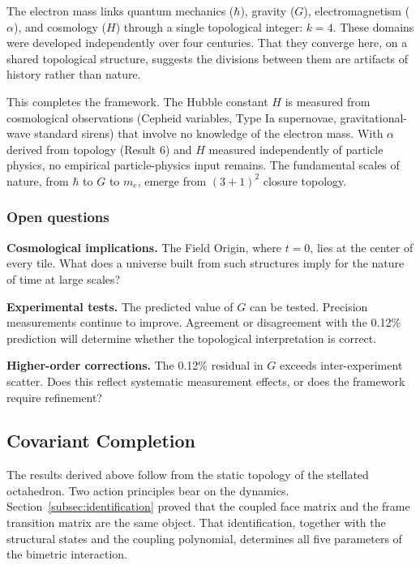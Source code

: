 \documentclass[aps,prd,preprint,superscriptaddress,showpacs,preprintnumbers,amsmath,amssymb,nofootinbib]{revtex4-2}
\begin{document}
The electron mass links quantum mechanics ($\hbar$), gravity ($G$), electromagnetism ($\alpha$), and cosmology ($H$) through a single topological integer: $k = 4$. These domains were developed independently over four centuries. That they converge here, on a shared topological structure, suggests the divisions between them are artifacts of history rather than nature.

This completes the framework. The Hubble constant $H$ is measured from cosmological observations (Cepheid variables, Type Ia supernovae, gravitational-wave standard sirens) that involve no knowledge of the electron mass. With $\alpha$ derived from topology (Result 6) and $H$ measured independently of particle physics, no empirical particle-physics input remains. The fundamental scales of nature, from $\hbar$ to $G$ to $m_e$, emerge from $(3+1)^2$ closure topology.

\subsubsection*{Open questions}

\textbf{Cosmological implications.} The Field Origin, where $t = 0$, lies at the center of every tile. What does a universe built from such structures imply for the nature of time at large scales?

\textbf{Experimental tests.} The predicted value of $G$ can be tested. Precision measurements continue to improve. Agreement or disagreement with the 0.12\% prediction will determine whether the topological interpretation is correct.

\textbf{Higher-order corrections.} The 0.12\% residual in $G$ exceeds inter-experiment scatter. Does this reflect systematic measurement effects, or does the framework require refinement?

\subsection{Covariant Completion}
\label{subsec:covariant-completion}

The results derived above follow from the static topology of the stellated octahedron. Two action principles bear on the dynamics. Section~\ref{subsec:identification} proved that the coupled face matrix and the frame transition matrix are the same object. That identification, together with the structural states and the coupling polynomial, determines all five parameters of the bimetric interaction.
\end{document}
